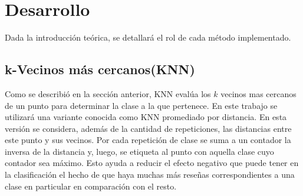 \section{Desarrollo}

Dada la introducción teórica, se detallará  el rol de cada método implementado.

\subsection{k-Vecinos más cercanos(KNN)}


Como se describió en la sección anterior, KNN evalúa los $k$ vecinos mas cercanos de un punto para determinar la clase a la que pertenece. En este trabajo se utilizará una variante conocida como KNN promediado por distancia. En esta versión se considera, además de la cantidad de repeticiones, las distancias entre este punto y sus vecinos. Por cada repetición de clase se suma a un contador la inversa de la distancia y, luego, se etiqueta al punto con aquella clase cuyo contador sea máximo. Esto ayuda a reducir el efecto negativo que puede tener en la clasificación el hecho de que haya muchas más reseñas correspondientes a una clase en particular en comparación con el resto. 

